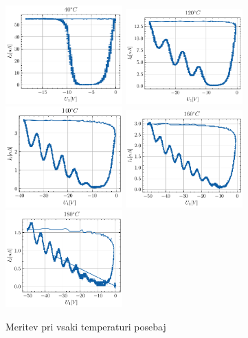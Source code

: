 \documentclass[10pt]{article}
\begin{document}
\begin{figure}[ht]
    \begin{center}
        \includegraphics[width=4.5cm]{40.pdf}
        \includegraphics[width=4.5cm]{120.pdf}
        \includegraphics[width=4.5cm]{140.pdf}
        \includegraphics[width=4.5cm]{160.pdf}
        \includegraphics[width=4.5cm]{180.pdf}
        \caption{Meritev pri vsaki temperaturi posebaj}
        \label{posebej}
    \end{center}
\end{figure}
\end{document}

